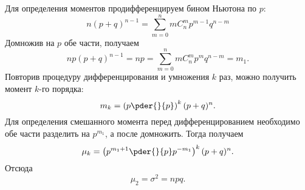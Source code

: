     Для определения моментов продифференцируем бином Ньютона по \( p \):
    \[
        n(p+q)^{n-1} = \sum_{m=0}^n m C_n^m p^{m-1} q^{n-m}
    \]
    Домножив на \( p \) обе части, получаем
    \[
        np(p+q)^{n-1} = np = \sum_{m=0}^n m C_n^m p^m q^{n-m} = m_1.
    \]
    Повторив процедуру дифференцирования и умножения \( k \) раз, можно получить
    момент \( k \)-го порядка:
    \[
        m_k = \left( p \pder{}{p} \right)^k (p+q)^n.
    \]
    Для определения смешанного момента перед дифференцированием необходимо обе
    части разделить на \( p^{m_1} \), а после домножить. Тогда получаем
    \[
        \mu_k = \left( p^{m_1+1} \pder{}{p} p^{-m_1} \right)^k (p+q)^n.
    \]
    Отсюда
    \[
        \mu_2 = \sigma^2 = npq.
    \]

